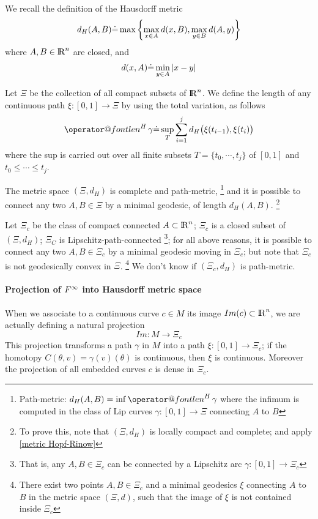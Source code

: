 \documentclass[twoside,a4paper,english]{article}
\makeatletter
\def\len{\mathop{\operator@font len}\nolimits}
\makeatother
\begin{document}
We recall the definition of the Hausdorff metric
\[ d_H(A,B) {\stackrel{\mbox{.}}{=}} \max \left\{ \max_{x\in A} d(x,B) ,
\max_{y\in B} d(A,y)  \right\} \]
where $A,B\in{\protect\mathrm{l\hskip-0.15em R}}^n$ are closed,  and
\[ d(x,A) {\stackrel{\mbox{.}}{=}}  \min_{y\in A} |x-y| \]

Let $\Xi$ be the
collection of all compact subsets of ${\protect\mathrm{l\hskip-0.15em R}}^n$.
We define the length of any continuous path
$\xi:[0,1]\to\Xi$
by using the total variation, as follows
\begin{equation}
  \label{eq: variation as len}
  \len ^H\gamma \defeq \sup_T \sum_{i=1}^j d_H\big(\xi(t_{i-1}),\xi(t_{i})\big)
\end{equation}
where the sup is carried out over all finite subsets
$T=\{t_0,\cdots,t_j\}$ of $[0,1]$ and $t_0\le\cdots\le t_j$.

The metric space $(\Xi,d_H)$ is complete and path-metric,%
\footnote{Path-metric: $d_H(A,B)=\inf \len ^H\gamma$ where the 
 infimum is computed in the class of Lip curves 
 $\gamma:[0,1]\to\Xi$ connecting $A$ to $B$
}
and it is possible to connect any two $A,B\in \Xi$
by a minimal geodesic, of length  $d_H(A,B)$.%
\footnote{To prove this, note that $(\Xi,d_H)$
  is locally compact and complete; and apply \ref{metric Hopf-Rinow}
}

Let $\Xi_c$ be the class of compact connected $A\subset{\protect\mathrm{l\hskip-0.15em R}}^n$;
$\Xi_c$ is a closed subset of $(\Xi,d_H)$; $\Xi_C$ is  Lipschitz-path-connected
\footnote{That is, any $A,B\in \Xi_c$ can be connected 
by a Lipschitz arc $\gamma:[0,1]\to\Xi_c$};
for all above reasons, it is possible to connect any two $A,B\in \Xi_c$
by a minimal geodesic moving in $\Xi_c$;
but note that $\Xi_c$ is not geodesically convex in $\Xi$.%
\footnote{There exist two points $A,B\in\Xi_c$ and a minimal geodesics $\xi$ 
  connecting $A$ to $B$ in the metric space $(\Xi,d)$, such that
  the image of $\xi$ is not contained inside $\Xi_c$}
We don't know if $(\Xi_c,d_H)$ is path-metric.

\paragraph{Projection of $F^\infty$ into Hausdorff metric space}

When we associate to a continuous curve $c\in M$ its image 
$Im(c)\subset{\protect\mathrm{l\hskip-0.15em R}}^n$, we are actually defining
a natural projection
\[ Im : M \to \Xi_c  \]
This projection transforms a path $\gamma$ in $M$ 
into a path $\xi:[0,1]\to\Xi_c$; if  
the homotopy $C(\theta,v)=\gamma(v)(\theta)$
is continuous, then $\xi$ is continuous.
Moreover the projection of all embedded curves $c$ 
is dense in $\Xi_c$.
\end{document}
